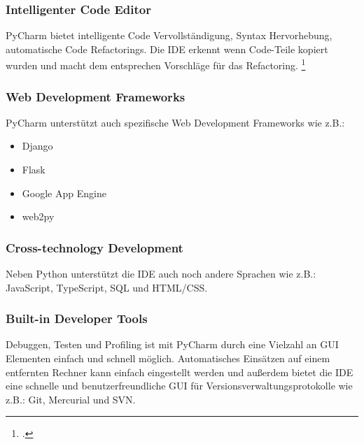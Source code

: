 \subsubsection{Intelligenter Code Editor}

\noindent
PyCharm bietet intelligente Code Vervollständigung, Syntax Hervorhebung, automatische Code Refactorings.
Die IDE erkennt wenn Code-Teile kopiert wurden und macht dem entsprechen Vorschläge für das Refactoring.
\footcite{noauthor_features_nodate}

\subsubsection{Web Development Frameworks}

\noindent
PyCharm unterstützt auch spezifische Web Development Frameworks wie z.B.:

\begin{itemize}
    \item Django
    \item Flask
    \item Google App Engine
    \item web2py
\end{itemize}

\subsubsection{Cross-technology Development}

\noindent
Neben Python unterstützt die IDE auch noch andere Sprachen wie z.B.: JavaScript, TypeScript, SQL und HTML/CSS.

\subsubsection{Built-in Developer Tools}

\noindent
Debuggen, Testen und Profiling ist mit PyCharm durch eine Vielzahl an GUI Elementen einfach und schnell möglich. Automatisches Einsätzen auf einem entfernten Rechner kann einfach eingestellt werden und außerdem bietet die IDE eine schnelle und benutzerfreundliche GUI für Versionsverwaltungsprotokolle wie z.B.: Git, Mercurial und SVN.

